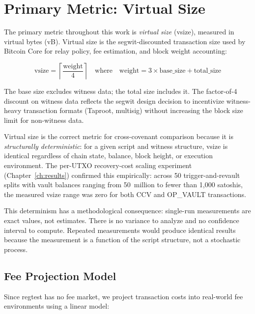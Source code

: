 \section{Primary Metric: Virtual Size} \label{se:metrics}

The primary metric throughout this work is \emph{virtual size} (vsize), measured in
virtual bytes (vB). Virtual size is the segwit-discounted transaction size used by
Bitcoin Core for relay policy, fee estimation, and block weight accounting:

\begin{equation} \label{eq:vsize}
\text{vsize} = \left\lceil \frac{\text{weight}}{4} \right\rceil
\quad \text{where} \quad
\text{weight} = 3 \times \text{base\_size} + \text{total\_size}
\end{equation}

\noindent
The base size excludes witness data; the total size includes it. The factor-of-4
discount on witness data reflects the segwit design decision to incentivize
witness-heavy transaction formats (Taproot, multisig) without increasing the block
size limit for non-witness data.

Virtual size is the correct metric for cross-covenant comparison because it is
\emph{structurally deterministic}: for a given script and witness structure, vsize
is identical regardless of chain state, balance, block height, or execution
environment. The per-UTXO recovery-cost scaling experiment (Chapter~\ref{ch:results})
confirmed this empirically: across 50 trigger-and-revault splits with vault
balances ranging from 50~million to fewer than 1{,}000 satoshis, the measured vsize
range was zero for both CCV and OP\_VAULT transactions.

This determinism has a methodological consequence: single-run measurements are
exact values, not estimates. There is no variance to analyze and no confidence
interval to compute. Repeated measurements would produce identical results because
the measurement is a function of the script structure, not a stochastic process.

\subsection{Fee Projection Model} \label{ss:fee_projection}

Since regtest has no fee market, we project transaction costs into real-world fee
environments using a linear model:


